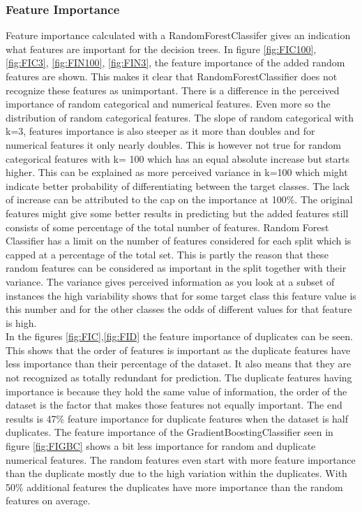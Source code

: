 \documentclass[a4paper,10pt]{article}
\begin{document}
\subsubsection{Feature Importance}\label{chapter312}
Feature importance calculated with a RandomForestClassifer gives an indication what features are important for the decision trees. In figure \ref{fig:FIC100}, \ref{fig:FIC3}, \ref{fig:FIN100}, \ref{fig:FIN3}, the feature importance of the added random features are shown. This makes it clear that RandomForestClassifier does not recognize these features as unimportant. There is a difference in the perceived importance of random categorical and numerical features. Even more so the distribution of random categorical features. The slope of random categorical with k=3, features importance is also steeper as it more than doubles and for numerical features it only nearly doubles. This is however not true for random categorical features with k= 100 which has an equal absolute increase but starts higher. This can be explained as more perceived variance in k=100 which might indicate better probability of differentiating between the target classes. The lack of increase can be attributed to the cap on the importance at 100$\%$. The original features might give some better results in predicting but the added features still consists of some percentage of the total number of features. Random Forest Classifier has a limit on the number of features considered for each split which is capped at a percentage of the total set. This is partly the reason that these random features can be considered as important in the split together with their variance. The variance gives perceived information as you look at a subset of instances the high variability shows that for some target class this feature value is this number and for the other classes the odds of different values for that feature is high. 
\\

In the figures \ref{fig:FIC},\ref{fig:FID} the feature importance of duplicates can be seen. This shows that the order of features is important as the duplicate features have less importance than their percentage of the dataset. It also means that they are not recognized as totally redundant for prediction. The duplicate features having importance is because they hold the same value of information, the order of the dataset is the factor that makes those features not equally important. The end results is 47$\%$ feature importance for duplicate features when the dataset is half duplicates. The feature importance of the GradientBoostingClassifier seen in figure \ref{fig:FIGBC} shows a bit less importance for random and duplicate numerical features. The random features even start with more feature importance than the duplicate mostly due to the high variation within the duplicates. With 50$\%$ additional features the duplicates have more importance than the random features on average. 
\end{document}

